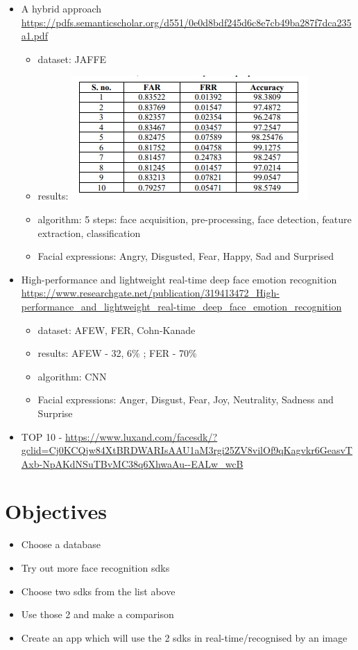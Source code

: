 \documentclass[a4paper,12pt]{article}
\begin{document}
\begin{itemize}
        \item  A hybrid approach \url{https://pdfs.semanticscholar.org/d551/0e0d8bdf245d6c8e7cb49ba287f7dca235a1.pdf}
        \begin{itemize}
            \item dataset: JAFFE
            \item results: \includegraphics[]{hybrid-approach.png}
            \item algorithm: 5 steps: face acquisition, pre-processing, face detection, feature extraction, classification
            \item Facial expressions: Angry, Disgusted, Fear, Happy, Sad and Surprised
        \end{itemize}
        \item  High-performance and lightweight real-time deep face emotion recognition \url{https://www.researchgate.net/publication/319413472_High-performance_and_lightweight_real-time_deep_face_emotion_recognition}
        \begin{itemize}
            \item dataset: AFEW, FER, Cohn-Kanade
            \item results: AFEW - 32, 6\% ; FER - 70\% 
            \item algorithm: CNN
            \item Facial expressions: Anger, Disgust, Fear, Joy, Neutrality, Sadness
            and Surprise
        \end{itemize}
        \item TOP 10 - \url{https://www.luxand.com/facesdk/?gclid=Cj0KCQjw84XtBRDWARIsAAU1aM3rgi25ZV8vilOf9qKagvkr6GeasvTAxb-NpAKdNSuTBvMC38q6XhwaAu--EALw_wcB}
    \end{itemize}

    \section*{Objectives}
    \begin{itemize}
        \item Choose a database
        \item Try out more face recognition sdks
        \item Choose two sdks from the list above
        \item Use those 2 and make a comparison
        \item Create an app which will use the 2 sdks in real-time/recognised by an image
    \end{itemize}
\end{document}
